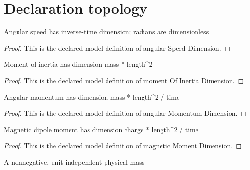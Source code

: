 \section{Declaration topology}
\begin{definition}
  \label{def:physics:phyx-mini-0563:phyxminiproblems-problemphyxmini0563-angularspeeddimension}
  Angular speed has inverse-time dimension; radians are dimensionless
\end{definition}
\begin{proof}
  This is the declared model definition of angular Speed Dimension.
\end{proof}
\begin{definition}
  \label{def:physics:phyx-mini-0563:phyxminiproblems-problemphyxmini0563-momentofinertiadimension}
  Moment of inertia has dimension mass * length\textasciicircum{}2
\end{definition}
\begin{proof}
  This is the declared model definition of moment Of Inertia Dimension.
\end{proof}
\begin{definition}
  \label{def:physics:phyx-mini-0563:phyxminiproblems-problemphyxmini0563-angularmomentumdimension}
  Angular momentum has dimension mass * length\textasciicircum{}2 / time
\end{definition}
\begin{proof}
  This is the declared model definition of angular Momentum Dimension.
\end{proof}
\begin{definition}
  \label{def:physics:phyx-mini-0563:phyxminiproblems-problemphyxmini0563-magneticmomentdimension}
  Magnetic dipole moment has dimension charge * length\textasciicircum{}2 / time
\end{definition}
\begin{proof}
  This is the declared model definition of magnetic Moment Dimension.
\end{proof}
\begin{definition}
  \label{def:physics:phyx-mini-0563:phyxminiproblems-problemphyxmini0563-massquantity}
  A nonnegative, unit-independent physical mass
\end{definition}
